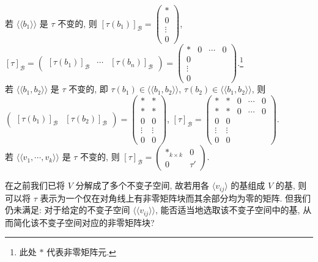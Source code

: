 \documentclass{note}
\begin{document}
\begin{eg}
    若 $\langle\langle b_1\rangle\rangle$ 是 $\tau$ 不变的, 则 $[\tau(b_1)]_{\mathcal{B}}=\begin{pmatrix}
        *\\
        0\\
        \vdots\\
        0
    \end{pmatrix}$, $[\tau]_{\mathcal{B}}=\begin{pmatrix}
        [\tau(b_1)]_{\mathcal{B}}&\cdots&[\tau(b_n)]_{\mathcal{B}}
    \end{pmatrix}=\begin{pmatrix}
        *&0&\cdots&0\\
        0\\
        \vdots\\
        0
    \end{pmatrix}$.\footnote{此处 $*$ 代表非零矩阵元.}\\
    若 $\langle\langle b_1,b_2\rangle\rangle$ 是 $\tau$ 不变的, 即 $\tau(b_1)\in\langle\langle b_1,b_2\rangle\rangle$, $\tau(b_2)\in\langle\langle b_1,b_2\rangle\rangle$, 则 $\begin{pmatrix}
        [\tau(b_1)]_{\mathcal{B}}&[\tau(b_2)]_{\mathcal{B}}
    \end{pmatrix}=\begin{pmatrix}
        *&*\\
        *&*\\
        0&0\\
        \vdots&\vdots\\
        0&0
    \end{pmatrix}$, $[\tau]_{\mathcal{B}}=\begin{pmatrix}
        *&*&0&\cdots&0\\
        *&*&0&\cdots&0\\
        0&0\\
        \vdots&\vdots\\
        0&0
    \end{pmatrix}$.\\
    若 $\langle\langle v_1,\cdots,v_k\rangle\rangle$ 是 $\tau$ 不变的, 则 $[\tau]_{\mathcal{B}}=\begin{pmatrix}
        *_{k\times k}&0\\
        0&\tau'
    \end{pmatrix}$.
\end{eg}

在之前我们已将 $V$ 分解成了多个不变子空间, 故若用各 $\langle v_{ij}\rangle$ 的基组成 $V$ 的基, 则可以将 $\tau$ 表示为一个仅在对角线上有非零矩阵块而其余部分均为零的矩阵. 但我们仍未满足: 对于给定的不变子空间 $\langle\langle v_{ij}\rangle\rangle$, 能否适当地选取该不变子空间中的基, 从而简化该不变子空间对应的非零矩阵块?
\end{document}
